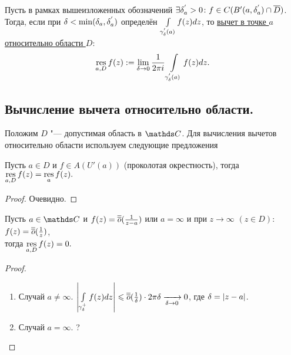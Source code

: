 \begin{Def} 
Пусть в рамках вышеизложенных обозначений $\exists \delta_a^{'} > 0 \colon f \in C(B'(a,\delta_a^{'})\cap \overline{D})$.\\ Тогда, если при $\delta < \min(\delta_a,\delta_a^{'})$ определён $\int\limits_{\gamma_{\delta}^{'}(a)}f(z)dz$,   то  \underline{вычет в точке $a$ относительно области $D$}$\colon$
\[
\mathop{\rm res}\limits\limits_{a,D} f(z) := \lim\limits_{\delta \rightarrow 0} \frac{1}{2\pi i} \int\limits_{\gamma_{\delta}^{'}(a)}f(z)dz.
\] 
\end{Def}


\subsection{Вычисление вычета относительно области.}
Положим $D$ "--- допустимая область в $\C$. Для вычисления вычетов относительно области используем следующие предложения

\begin{Pre}
Пусть $a \in D$ и $f \in A(U'(a))$ (проколотая окрестность), тогда $\mathop{\rm res}\limits\limits_{a, D}f(z) = \mathop{\rm res}\limits\limits_{a}f(z).$
\end{Pre}
\begin{proof}
Очевидно.
\end{proof}

\begin{Pre}
Пусть $a \in \C$ и $f(z) = \overline{\overline{o}}(\frac{1}{z-a})$ или $a =\infty$ и при $z \to \infty$ $(z \in D)\colon$  $f(z) = \overline{\overline{o}}(\frac{1}{z}) $, \\тогда $\mathop{\rm res}\limits\limits_{a, D}f(z) = 0.$
\end{Pre}
\begin{proof}
\begin{enumerate}
\item Случай $a \not= \infty$. 
$\left|  \int\limits_{\gamma_{\delta}^{+}} f(z)dz \right| \leqslant \overline{\overline{o}}(\frac{1}{\delta}) \cdot 2\pi\delta \xrightarrow[\delta\rightarrow 0]{} 0$, где $\delta = |z - a|$.
\item Случай $a = \infty$. ?
\end{enumerate}
\end{proof}


